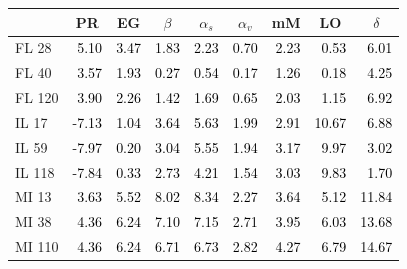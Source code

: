 \begin{tabular}{lrrrrrrrr}
\toprule
 & \multicolumn{1}{c}{PR} & \multicolumn{1}{c}{EG} & \multicolumn{1}{c}{$\beta$} & \multicolumn{1}{c}{$\alpha_s$} & \multicolumn{1}{c}{$\alpha_v$} & \multicolumn{1}{c}{mM} & \multicolumn{1}{c}{LO} & \multicolumn{1}{c}{$\delta$} \\
\midrule
FL 28 & \textcolor{black}{ 5.10 } & \textcolor{black}{ 3.47 } & \textcolor{black}{ 1.83 } & \textcolor{black}{ 2.23 } & \textcolor{black}{ 0.70 } & \textcolor{black}{ 2.23 } & \textcolor{black}{ 0.53 } & \textcolor{black}{ 6.01 } \\
FL 40 & \textcolor{black}{ 3.57 } & \textcolor{black}{ 1.93 } & \textcolor{black}{ 0.27 } & \textcolor{black}{ 0.54 } & \textcolor{black}{ 0.17 } & \textcolor{black}{ 1.26 } & \textcolor{black}{ 0.18 } & \textcolor{black}{ 4.25 } \\
FL 120 & \textcolor{black}{ 3.90 } & \textcolor{black}{ 2.26 } & \textcolor{black}{ 1.42 } & \textcolor{black}{ 1.69 } & \textcolor{black}{ 0.65 } & \textcolor{black}{ 2.03 } & \textcolor{black}{ 1.15 } & \textcolor{black}{ 6.92 } \\
IL 17 & \textcolor{black}{ -7.13 } & \textcolor{black}{ 1.04 } & \textcolor{black}{ 3.64 } & \textcolor{black}{ 5.63 } & \textcolor{black}{ 1.99 } & \textcolor{black}{ 2.91 } & \textcolor{black}{ 10.67 } & \textcolor{black}{ 6.88 } \\
IL 59 & \textcolor{black}{ -7.97 } & \textcolor{black}{ 0.20 } & \textcolor{black}{ 3.04 } & \textcolor{black}{ 5.55 } & \textcolor{black}{ 1.94 } & \textcolor{black}{ 3.17 } & \textcolor{black}{ 9.97 } & \textcolor{black}{ 3.02 } \\
IL 118 & \textcolor{black}{ -7.84 } & \textcolor{black}{ 0.33 } & \textcolor{black}{ 2.73 } & \textcolor{black}{ 4.21 } & \textcolor{black}{ 1.54 } & \textcolor{black}{ 3.03 } & \textcolor{black}{ 9.83 } & \textcolor{black}{ 1.70 } \\
MI 13 & \textcolor{black}{ 3.63 } & \textcolor{black}{ 5.52 } & \textcolor{black}{ 8.02 } & \textcolor{black}{ 8.34 } & \textcolor{black}{ 2.27 } & \textcolor{black}{ 3.64 } & \textcolor{black}{ 5.12 } & \textcolor{black}{ 11.84 } \\
MI 38 & \textcolor{black}{ 4.36 } & \textcolor{black}{ 6.24 } & \textcolor{black}{ 7.10 } & \textcolor{black}{ 7.15 } & \textcolor{black}{ 2.71 } & \textcolor{black}{ 3.95 } & \textcolor{black}{ 6.03 } & \textcolor{black}{ 13.68 } \\
MI 110 & \textcolor{black}{ 4.36 } & \textcolor{black}{ 6.24 } & \textcolor{black}{ 6.71 } & \textcolor{black}{ 6.73 } & \textcolor{black}{ 2.82 } & \textcolor{black}{ 4.27 } & \textcolor{black}{ 6.79 } & \textcolor{black}{ 14.67 } \\

\end{tabular}
